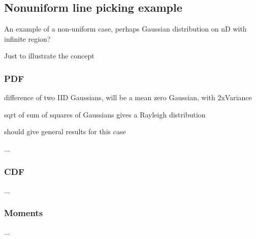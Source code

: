 \subsection{Nonuniform line picking example}
\label{sec:nonuniform_line}

An example of a non-uniform case, perhaps Gaussian distribution on nD
with infinite region?

Just to illustrate the concept





\subsubsection{PDF}

difference of two IID Gaussians, will be a mean zero Gaussian, with 2xVariance

sqrt of sum of squares of Gaussians gives a Rayleigh distribution

should give general results for this case

...

\subsubsection{CDF}

...


\subsubsection{Moments}

...



